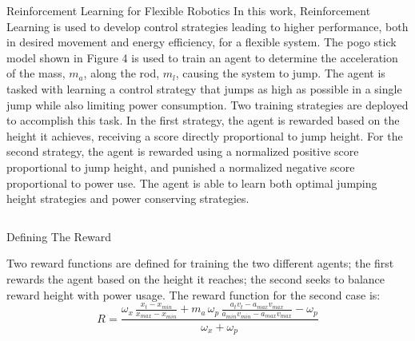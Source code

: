 \documentclass[final]{beamer}
\newlength{\onecolwid}
\newlength{\twocolwid}
\begin{document}
\begin{frame}[t]
\begin{columns}[t]
\begin{column}{\twocolwid}
\begin{block}{Reinforcement Learning for Flexible Robotics}
In this work, Reinforcement Learning is used to develop control strategies leading to higher performance, both in desired movement and energy efficiency, for a flexible system. The pogo stick model shown in Figure 4 is used to train an agent to determine the acceleration of the mass, $m_a$, along the rod, $m_l$, causing the system to jump. The agent is tasked with learning a control strategy that jumps as high as possible in a single jump while also limiting power consumption. Two training strategies are deployed to accomplish this task. In the first strategy, the agent is rewarded based on the height it achieves, receiving a score directly proportional to jump height. For the second strategy, the agent is rewarded using a normalized positive score proportional to jump height, and punished a normalized negative score proportional to power use. The agent is able to learn both optimal jumping height strategies and power conserving strategies.
\end{block} 

\begin{columns}[t,totalwidth=\twocolwid] %

\begin{column}{\onecolwid}\vspace{-.57in} %





\begin{block}{Defining The Reward}

    Two reward functions are defined for training the two different agents; the first rewards the agent based on the height it reaches; the second seeks to balance reward height with power usage. The reward function for the second case is: 
    \vspace{0.32in}
    \begin{equation}
        R=\frac{\omega_x\, \frac{x_t - x_{min}}{x_{max} - x_{min}} + m_a\,\omega_p\, \frac{a_t v_t - a_{max} v_{max}}{a_{min} v_{min} - a_{max} v_{max}} - \omega_p}{\omega_x + \omega_p}
        \label{eq:Reward function}
    \end{equation}
    \vspace{-0.18in}


\end{block}
\end{column}
\end{columns}
\end{column}
\end{columns}
\end{frame}
\end{document}

